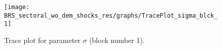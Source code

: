 \begin{figure}[H]
\centering
  \texttt{[image: BRS\_sectoral\_wo\_dem\_shocks\_res/graphs/TracePlot\_sigma\_blck\_1]}\\
    \caption{Trace plot for parameter ${\sigma}$ (block number 1).}
\end{figure}
